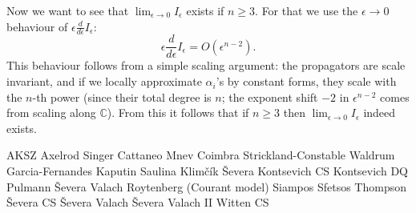 \documentclass[a4paper]{amsart}
\theoremstyle{plain}
\theoremstyle{definition}
\newcommand{\C}{\mathbb{C}}
\begin{document}
Now we want to see that $\lim_{\epsilon\to0}I_\epsilon$ exists if $n\geq3$. For that we use the $\epsilon\to0$ behaviour of $\epsilon\frac d{d\epsilon}I_\epsilon$:
$$\epsilon\frac d{d\epsilon}I_\epsilon=O(\epsilon^{n-2}).$$
This behaviour follows from a simple scaling argument: the propagators are scale invariant, and if we locally approximate $\alpha_i$'s by constant forms, they scale with the $n$-th power (since their total degree is $n$; the exponent shift $-2$ in $\epsilon^{n-2}$ comes from scaling along $\C$). From this it follows that if $n\geq3$ then $\lim_{\epsilon\to0}I_\epsilon$ indeed exists.



\begin{thebibliography}{99}
 AKSZ
 Axelrod Singer
 Cattaneo Mnev
 Coimbra Strickland-Constable Waldrum
 Garcia-Fernandes
 Kaputin Saulina
 Klimčík Ševera
 Kontsevich CS
 Kontsevich DQ
 Pulmann Ševera Valach
 Roytenberg (Courant model)
 Siampos Sfetsos Thompson 
 Ševera CS
 Ševera Valach
 Ševera Valach II
 Witten CS


\end{thebibliography}
\end{document}
